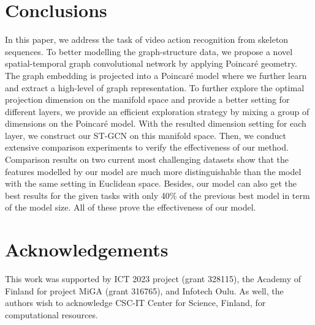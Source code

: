 \documentclass[letterpaper]{article} \usepackage{aaai19}  \usepackage{times}  \usepackage{helvet} \usepackage{courier}  \usepackage[hyphens]{url}  \usepackage{graphicx} \urlstyle{rm} \def\UrlFont{\rm}  \usepackage{graphicx}  \frenchspacing  \setlength{\pdfpagewidth}{8.5in}  \setlength{\pdfpageheight}{11in}
\begin{document}
\section{Conclusions}\label{sec:conclusion}

In this paper, we address the task of video action recognition from skeleton sequences. To better modelling the graph-structure data, we propose a novel spatial-temporal graph convolutional network by applying Poincar\'e geometry. The graph embedding is projected into a Poincar\'e model where we further learn and extract a high-level of graph representation. To further explore the optimal projection dimension on the manifold space and provide a better setting for different layers, we provide an efficient exploration strategy by mixing a group of dimensions on the Poincar\'e model. With the resulted dimension setting for each layer, we construct our ST-GCN on this manifold space. Then, we conduct extensive comparison experiments to verify the effectiveness of our method. Comparison results on two current most challenging datasets show that the features modelled by our model are much more distinguishable than the model with the same setting in Euclidean space. Besides, our model can also get the best results for the given tasks with only 40\% of the previous best model in term of the model size. All of these prove the effectiveness of our model.


\section{Acknowledgements}
This work was supported by ICT 2023 project (grant 328115), the Academy of Finland for project MiGA (grant 316765), and Infotech Oulu. As well, the authors wish to acknowledge
CSC-IT Center for Science, Finland, for computational resources.



\end{document}
